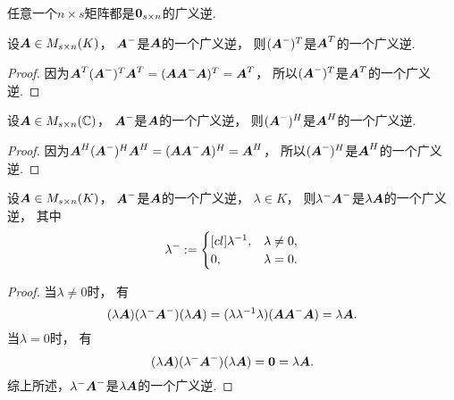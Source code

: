 \begin{property}\label{theorem:线性方程组.广义逆的性质2}
任意一个\(n \times s\)矩阵都是\(\boldsymbol0_{s \times n}\)的广义逆.
\end{property}

\begin{theorem}
设\(\boldsymbol{A} \in M_{s \times n}(K)\)，
\(\boldsymbol{A}^-\)是\(\boldsymbol{A}\)的一个广义逆，
则\((\boldsymbol{A}^-)^T\)是\(\boldsymbol{A}^T\)的一个广义逆.
\begin{proof}
因为\(
	\boldsymbol{A}^T (\boldsymbol{A}^-)^T \boldsymbol{A}^T
	= (\boldsymbol{A} \boldsymbol{A}^- \boldsymbol{A})^T
	= \boldsymbol{A}^T
\)，
所以\((\boldsymbol{A}^-)^T\)是\(\boldsymbol{A}^T\)的一个广义逆.
\end{proof}
\end{theorem}

\begin{theorem}
设\(\boldsymbol{A} \in M_{s \times n}(\mathbb{C})\)，
\(\boldsymbol{A}^-\)是\(\boldsymbol{A}\)的一个广义逆，
则\((\boldsymbol{A}^-)^H\)是\(\boldsymbol{A}^H\)的一个广义逆.
\begin{proof}
因为\(
	\boldsymbol{A}^H (\boldsymbol{A}^-)^H \boldsymbol{A}^H
	= (\boldsymbol{A} \boldsymbol{A}^- \boldsymbol{A})^H
	= \boldsymbol{A}^H
\)，
所以\((\boldsymbol{A}^-)^H\)是\(\boldsymbol{A}^H\)的一个广义逆.
\end{proof}
\end{theorem}

\begin{theorem}
设\(\boldsymbol{A} \in M_{s \times n}(K)\)，
\(\boldsymbol{A}^-\)是\(\boldsymbol{A}\)的一个广义逆，
\(\lambda \in K\)，
则\(\lambda^- \boldsymbol{A}^-\)是\(\lambda \boldsymbol{A}\)的一个广义逆，
其中\begin{equation*}
	\lambda^-
	:=
	\begin{cases}[cl]
		\lambda^{-1}, & \lambda\neq0, \\
		0, & \lambda=0.
	\end{cases}
\end{equation*}
\begin{proof}
当\(\lambda\neq0\)时，
有\begin{equation*}
	(\lambda \boldsymbol{A})
	(\lambda^- \boldsymbol{A}^-)
	(\lambda \boldsymbol{A})
	= (\lambda \lambda^{-1} \lambda) (\boldsymbol{A} \boldsymbol{A}^- \boldsymbol{A})
	= \lambda \boldsymbol{A}.
\end{equation*}
当\(\lambda=0\)时，
有\begin{equation*}
	(\lambda \boldsymbol{A})
	(\lambda^- \boldsymbol{A}^-)
	(\lambda \boldsymbol{A})
	= \boldsymbol0
	= \lambda \boldsymbol{A}.
\end{equation*}
综上所述，\(\lambda^- \boldsymbol{A}^-\)是\(\lambda \boldsymbol{A}\)的一个广义逆.
\end{proof}
\end{theorem}

